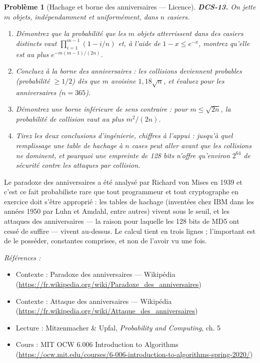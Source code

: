 \documentclass[11pt]{article}
\newtheorem{problem}{Problème}
\newenvironment{refs}{\par\small\noindent\emph{Références :}\begin{itemize}\setlength\itemsep{0pt}}{\end{itemize}\normalsize}
\begin{document}
\begin{problem}[{Hachage et borne des anniversaires --- Licence}]
\textbf{DCS-13.} On jette $m$ objets, indépendamment et uniformément, dans $n$ casiers.
\begin{enumerate}
\item[(a)] Démontrez que la probabilité que les $m$ objets atterrissent dans des casiers distincts vaut $\prod_{i=1}^{m-1}(1 - i/n)$ et, à l'aide de $1 - x \le e^{-x}$, montrez qu'elle est au plus $e^{-m(m-1)/(2n)}$.
\item[(b)] Concluez à la borne des anniversaires : les collisions deviennent probables (probabilité $\ge 1/2$) dès que $m$ avoisine $1{,}18\sqrt{n}$, et évaluez pour les anniversaires ($n = 365$).
\item[(c)] Démontrez une borne inférieure de sens contraire : pour $m \le \sqrt{2n}$, la probabilité de collision vaut au plus $m^2/(2n)$.
\item[(d)] Tirez les deux conclusions d'ingénierie, chiffres à l'appui : jusqu'à quel remplissage une table de hachage à $n$ cases peut aller avant que les collisions ne dominent, et pourquoi une empreinte de 128 bits n'offre qu'environ $2^{64}$ de sécurité contre les attaques par collision.
\end{enumerate}

\end{problem}

\noindent Le paradoxe des anniversaires a été analysé par Richard von Mises en 1939 et c'est ce fait probabiliste rare que tout programmeur et tout cryptographe en exercice doit s'être approprié : les tables de hachage (inventées chez IBM dans les années 1950 par Luhn et Amdahl, entre autres) vivent sous le seuil, et les attaques des anniversaires --- la raison pour laquelle les 128 bits de MD5 ont cessé de suffire --- vivent au-dessus. Le calcul tient en trois lignes ; l'important est de le posséder, constantes comprises, et non de l'avoir vu une fois.

\begin{refs}
\item Contexte : Paradoxe des anniversaires --- Wikipédia (\url{https://fr.wikipedia.org/wiki/Paradoxe_des_anniversaires})
\item Contexte : Attaque des anniversaires --- Wikipédia (\url{https://fr.wikipedia.org/wiki/Attaque_des_anniversaires})
\item Lecture : Mitzenmacher \& Upfal, \textit{Probability and Computing}, ch. 5
\item Cours : MIT OCW 6.006 Introduction to Algorithms (\url{https://ocw.mit.edu/courses/6-006-introduction-to-algorithms-spring-2020/})
\end{refs}
\end{document}
